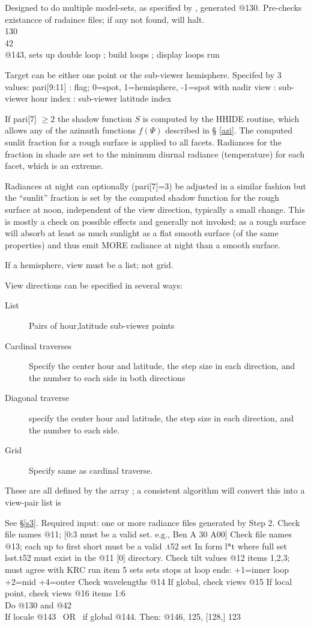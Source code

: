 \documentclass{article}
\begin{document}
Designed to do multiple model-sets, as specified by , generated @130.
Pre-checks existancce of radaince files; if any not found, will halt.
\\ 130
\\ 42
\\ @143, sets up double loop
 ; build loops
; display loops
 run

Target can be either one point or the sub-viewer hemisphere. Specifed by 3 values:
pari[9:11] 
: flag; 0=spot, 1=hemisphere, -1=spot with nadir view
: sub-viewer hour index
: sub-viewer latitude index

If pari[7] $\geq 2$ the shadow function $S$ is computed by the HHIDE routine,
which allows any of the azimuth functions $f(\Psi)$ described in \S
\ref{azi}. The computed sunlit fraction for a rough surface is applied to all
facets.  Radiances for the fraction in shade are set to the minimum diurnal
radiance (temperature) for each facet, which is an extreme.

Radiances at night can optionally (pari[7]=3) be adjusted in a similar fashion
but the ``sunlit'' fraction is set by the computed shadow function for the rough
surface at noon, independent of the view direction, typically a small
change. This is mostly a check on possible effects and generally not invoked; as
a rough surface will absorb at least as much sunlight as a flat smooth surface
(of the same properties) and thus emit MORE radiance at night than a smooth
surface.

If a hemisphere, view must be a list; not grid.

View directions can be specified in several ways: 
\begin{description}    %
 \item [List] Pairs of hour,latitude sub-viewer points
 \item [Cardinal traverses] Specify the center hour and latitude, the step size in each direction, and the number to each side in both directions
 \item [Diagonal traverse]  specify the center hour and latitude, the step size in each direction, and the number to each side.
 \item [Grid] Specify same as cardinal traverse.
\end{description}
These are all defined by the array ; a consistent algorithm will convert this into a view-pair list is 

See \S \ref{s3}. Required input: one or more radiance files generated by Step 2.
\qi Check file names @11; [0:3 must be a valid set. e.g., Ben A 30 A00]
\qi Check file names @13; each up to first short must be a valid .t52 set
\qii  In form l*t where full set lsst.t52 must exist in the @11 [0] directory.
\qi Check tilt values @12 items 1,2,3; must agree with KRC run
\qii item 5 sets sets stops at loop ends:  +1=inner loop +2=mid +4=outer
\qi Check wavelengths @14
\qi If global, check views @15
\qi If local point, check views @16 items 1:6 
\\ Do  @130 and @42 
\\ If locale @143 \  OR \ if global @144.  Then:  @146, 125, [128,] 123
\end{document}

